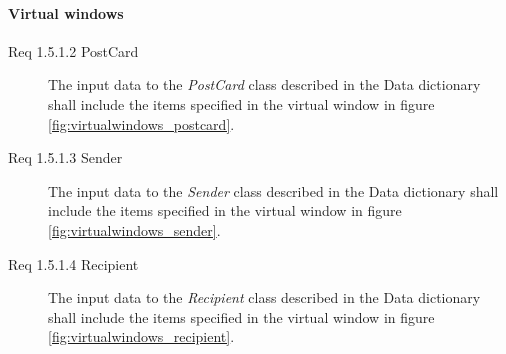 \documentclass[10pt,a4paper]{article}
\begin{document}
\paragraph{Virtual windows}
\begin {description}
\item[Req 1.5.1.2 PostCard] The input data to the \textit{PostCard} class described in the Data dictionary shall include the items specified in the virtual window in figure \ref{fig:virtualwindows_postcard}.

\item[Req 1.5.1.3 Sender] The input data to the \textit{Sender} class described in the Data dictionary shall include the items specified in the virtual window in figure \ref{fig:virtualwindows_sender}.

\item[Req 1.5.1.4 Recipient] The input data to the \textit{Recipient} class described in the Data dictionary shall include the items specified in the virtual window in figure \ref{fig:virtualwindows_recipient}.

\end{description}
\hfill
\end{document}
